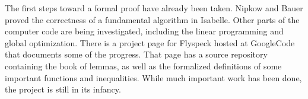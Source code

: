 The first steps toward a formal proof have already been taken.  Nipkow
and Bauer\cite{Nipkow:2005:Tame} proved the correctness of a
fundamental algorithm in Isabelle.  Other parts of the computer code
are being investigated, including the linear programming and global
optimization.  There is a project
page\cite{website:FlyspeckProjectPage} for Flyspeck hosted at
GoogleCode\cite{website:GoogleCode} that documents some of the
progress.  That page has a source repository containing the book of
lemmas, as well as the formalized definitions of some important
functions and inequalities.  While much important work has been done,
the project is still in its infancy.
